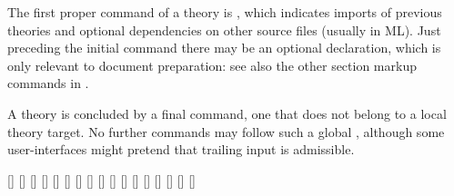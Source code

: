 \begin{isabellebody}
\begin{isamarkuptext}
  The first proper command of a theory is \hyperlink{command.theory}{\mbox{}}, which
  indicates imports of previous theories and optional dependencies on
  other source files (usually in ML).  Just preceding the initial
  \hyperlink{command.theory}{\mbox{}} command there may be an optional \hyperlink{command.header}{\mbox{}} declaration, which is only relevant to document
  preparation: see also the other section markup commands in
  .

  A theory is concluded by a final \hyperlink{command.global.end}{\mbox{}} command,
  one that does not belong to a local theory target.  No further
  commands may follow such a global \hyperlink{command.global.end}{\mbox{}},
  although some user-interfaces might pretend that trailing input is
  admissible.

  \begin{railoutput}
[]
[]
[]
\rail@bar
{}
[]
\rail@endbar
\rail@bar
{}
[]
\rail@endbar
{}[]
\rail@end
{}
[]
\rail@plus
{}[]
\rail@endplus
\rail@end
{}
[]
\rail@plus
\rail@plus
{}[]
\rail@endplus
\rail@bar
{}
[]
[]
[]
\rail@endbar
{}
[]
\rail@endplus
\rail@end
{}
[]
\rail@plus
\rail@bar
{}[]
[]
\rail@endbar
{}
\rail@endplus
\rail@end
\end{railoutput}


  \begin{description}


\end{description}
\end{isamarkuptext}
\end{isabellebody}
